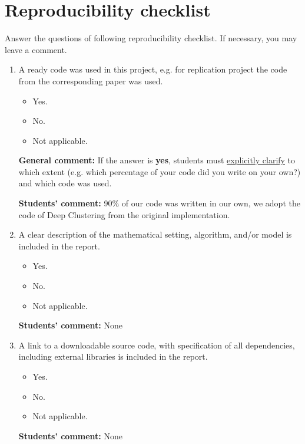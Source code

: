 \documentclass[10pt]{article}
\begin{document}
\section{Reproducibility checklist}
\label{appendix-checklist}
Answer the questions of following reproducibility checklist. If necessary, you may leave a comment.
    \begin{enumerate}
    \item A ready code was used in this project, e.g. for replication project the code from the corresponding paper was used.
    \begin{itemize}
        \item [\faCheckSquareO] Yes.
        \item [\faSquareO] No.
        \item [\faSquareO] Not applicable.
    \end{itemize}
    
    \textbf{General comment:} If the answer is \textbf{yes}, students must \underline{explicitly clarify} to which extent (e.g. which percentage of your code did you write on your own?) and which code was used.
    
    \textbf{Students' comment:} 90\% of our code was written in our own, we adopt the code of Deep Clustering from the original implementation.
    
    \item A clear description of the mathematical setting, algorithm, and/or model is included in the report.
    \begin{itemize}
        \item [\faCheckSquareO] Yes.
        \item [\faSquareO] No.
        \item [\faSquareO] Not applicable.
    \end{itemize}
    
    \textbf{Students' comment:} None
    
    \item A link to a downloadable source code, with specification of all dependencies, including external libraries is included in the report.
    \begin{itemize}
        \item [\faCheckSquareO] Yes.
        \item [\faSquareO] No.
        \item [\faSquareO] Not applicable.
    \end{itemize}
    
    \textbf{Students' comment:} None
    

\end{enumerate}
\end{document}
